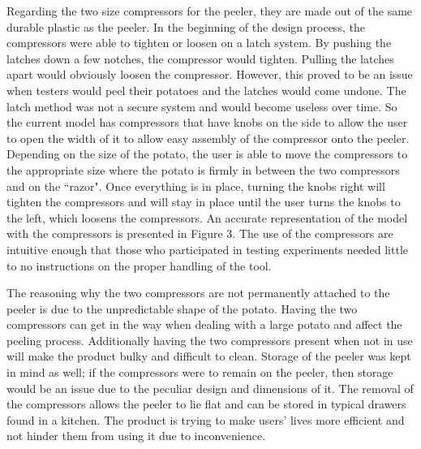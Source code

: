 \documentclass[twocolumn]{article}
\begin{document}
\par
Regarding the two size compressors for the peeler, they are made out of the same durable plastic as the peeler. In the beginning of the design process, the compressors were able to tighten or loosen on a latch system. By pushing the latches down a few notches, the compressor would tighten. Pulling the latches apart would obviously loosen the compressor. However, this proved to be an issue when testers would peel their potatoes and the latches would come undone. The latch method was not a secure system and would become useless over time. So the current model has compressors that have knobs on the side to allow the user to open the width of it to allow easy assembly of the compressor onto the peeler. Depending on the size of the potato, the user is able to move the compressors to the appropriate size where the potato is firmly in between the two compressors and on the ``razor". Once everything is in place, turning the knobs right will tighten the compressors and will stay in place until the user turns the knobs to the left, which loosens the compressors. An accurate representation of the model with the compressors is presented in Figure 3. The use of the compressors are intuitive enough that those who participated in testing experiments needed little to no instructions on the proper handling of the tool.
\par
The reasoning why the two compressors are not permanently attached to the peeler is due to the unpredictable shape of the potato. Having the two compressors can get in the way when dealing with a large potato and affect the peeling process. Additionally having the two compressors present when not in use will make the product bulky and difficult to clean. Storage of the peeler was kept in mind as well; if the compressors were to remain on the peeler, then storage would be an issue due to the peculiar design and dimensions of it. The removal of the compressors allows the peeler to lie flat and can be stored in typical drawers found in a kitchen. The product is trying to make users' lives more efficient and not hinder them from using it due to inconvenience.
\par
\end{document}
